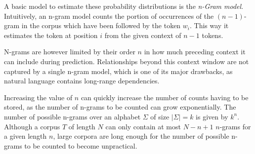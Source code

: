 \noindent
A basic model to estimate these probability distributions is the \textit{n-Gram model}.
\label{def:n-gram}
\noindent
Intuitively, an n-gram model counts the portion of occurrences of the $(n-1)$-gram in the corpus which have been followed by the token $w_i$. This way it estimates the token at position $i$ from the given context of $n-1$ tokens.

N-grams are however limited by their order $n$ in how much preceding context it can include during prediction. Relationships beyond this context window are not captured by a single n-gram model, which is one of its major drawbacks, as natural language contains long-range dependencies.

Increasing the value of $n$ can quickly increase the number of counts having to be stored, as the number of n-grams to be counted can grow exponentially. The number of possible n-grams over an alphabet $\Sigma$ of size $|\Sigma| = k$ is given by $k^n$. Although a corpus $T$ of length $N$ can only contain at most $N - n + 1$ $n$-grams for a given length $n$, large corpora are long enough for the number of possible n-grams to be counted to become unpractical.

